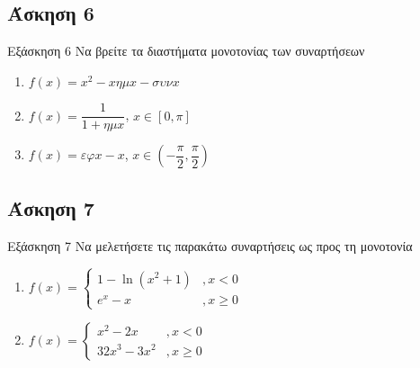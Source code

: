 \documentclass[greek]{beamer}
\begin{document}
\subsection{Άσκηση 6}
\begin{frame}[label=Άσκηση6]{Εξάσκηση 6}
  Να βρείτε τα διαστήματα μονοτονίας των συναρτήσεων
  \begin{enumerate}
    \item<1-> $f(x)=x^2-xημx-συνx$
    \item<2-> $f(x)=\dfrac{1}{1+ημx}$, $x\in [0,\pi]$
    \item<3-> $f(x)=εφx-x$, $x\in \left( -\dfrac{\pi}{2},\dfrac{\pi}{2} \right) $
  \end{enumerate}

\end{frame}

\subsection{Άσκηση 7}
\begin{frame}[label=Άσκηση7]{Εξάσκηση 7}
  Να μελετήσετε τις παρακάτω συναρτήσεις ως προς τη μονοτονία
  \begin{enumerate}
    \item<1-> $f(x)=\begin{cases}
          1-\ln (x^2+1) & ,x<0    \\
          e^x-x         & ,x\ge 0
        \end{cases}$
    \item<2-> $f(x)=\begin{cases}
          x^2-2x     & ,x<0    \\
          32x^3-3x^2 & ,x\ge 0
        \end{cases}$
  \end{enumerate}

\end{frame}
\end{document}
